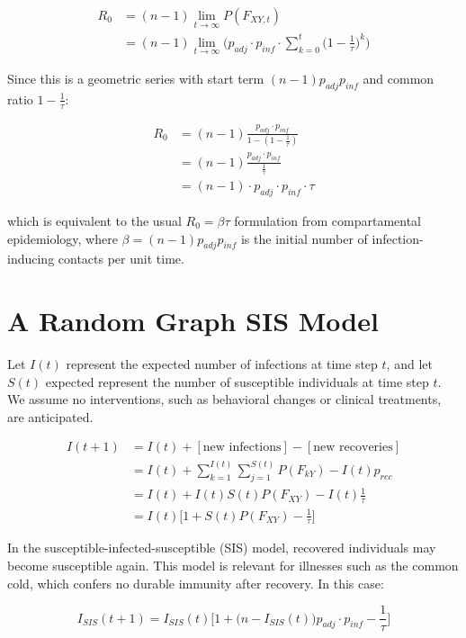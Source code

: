 \documentclass[psamsfonts]{amsart}
\theoremstyle{definition}
\theoremstyle{remark}
\numberwithin{equation}{section}
\begin{document}
\begin{align}
R_0 &= (n-1) \lim_{t \to \infty} P(F_{XY, t}) \nonumber\\
&= (n-1) \lim_{t \to \infty} \Bigg(p_{adj} \cdot  p_{inf} \cdot \sum_{k=0}^{t} \Big(1 -\frac{1}{\tau}\Big)^k\Bigg) \nonumber
\end{align}

Since this is a geometric series with start term $(n-1)  p_{adj} p_{inf}$ and common ratio $1 -\frac{1}{\tau}$:

\begin{align}
R_0 &= (n-1) \frac{p_{adj} \cdot  p_{inf}}{1-(1 -\frac{1}{\tau})} \nonumber\\
&= (n-1) \frac{p_{adj} \cdot  p_{inf}}{\frac{1}{\tau}} \nonumber\\
&= (n-1) \cdot p_{adj} \cdot  p_{inf} \cdot \tau
\end{align}

which is equivalent to the usual $R_0 = \beta \tau$ formulation from compartamental epidemiology, where $\beta = (n-1) p_{adj}  p_{inf}$ is the initial number of infection-inducing contacts per unit time.

\section{A Random Graph SIS Model}

Let $I(t)$ represent the expected number of infections at time step $t$, and let $S(t)$ expected represent the number of susceptible individuals at time step $t$. We assume no interventions, such as behavioral changes or clinical treatments, are anticipated.

\begin{align}
I(t+1) &= I(t) + [\text{new infections}] - [\text{new recoveries}] \nonumber\\
&= I(t) + \sum_{k=1}^{I(t)} \sum_{j=1}^{S(t)} P(F_{kY}) - I(t)p_{rec} \nonumber\\
&= I(t) + I(t)S(t)P(F_{XY}) - I(t)\frac{1}{\tau} \nonumber\\
&= I(t)\Bigg[1 + S(t)P(F_{XY}) - \frac{1}{\tau}\Bigg]
\end{align}

In the susceptible-infected-susceptible (SIS) model, recovered individuals may become susceptible again. This model is relevant for illnesses such as the common cold, which confers no durable immunity after recovery.  In this case:

\begin{equation}
I_{SIS}(t+1) = I_{SIS}(t)\Bigg[1 + \Big(n-I_{SIS}(t)\Big)p_{adj} \cdot p_{inf} - \frac{1}{\tau}\Bigg]
\end{equation}
\end{document}
